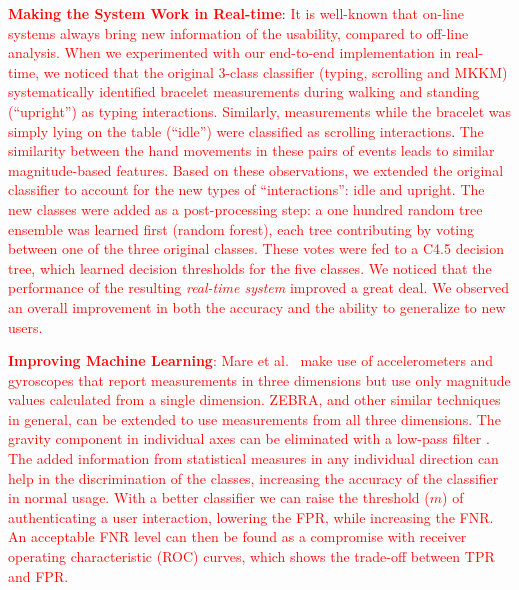 \documentclass[conference]{IEEEtran}
\newcommand{\zebra}{ZEBRA\xspace}
\newcommand\changeMika[1]{\textcolor{red}{#1}}
\newcommand\changeAsokan[1]{\textcolor{red}{#1}}
\newcommand\changeMika[1]{{#1}}
\newcommand\changeAsokan[1]{{#1}}
\begin{document}
\vspace{1mm}
\noindent\textbf{\changeMika{Making the System Work in Real-time}}:
\changeMika{
It is well-known that on-line systems always bring new information of the usability, compared to off-line analysis. When we experimented with our end-to-end implementation in real-time, we noticed that} \changeAsokan{the original 3-class classifier (typing, scrolling and MKKM)} \changeMika{systematically} \changeAsokan{identified} \changeMika{bracelet} \changeAsokan{measurements} \changeMika{during walking and standing (``upright'')} \changeAsokan{as typing interactions. Similarly, measurements while the bracelet was simply} \changeMika{lying on the table (``idle'')} \changeAsokan{were classified as scrolling interactions}. \changeMika{The similarity between the} \changeAsokan{hand} \changeMika{movements in these} \changeAsokan{pairs of events} \changeMika{leads to similar magnitude-based features. Based on these observations, we} \changeAsokan{extended the original classifier to account for the new types of ``interactions'': idle and upright.} \changeAsokan{The new} \changeMika{classes were added as a post-processing step: a one hundred random tree ensemble was learned first (random forest), each tree contributing by voting between one of the three original classes. These} \changeAsokan{votes} \changeMika{were fed to a C4.5 decision tree, which learned decision thresholds for the five classes.
We noticed that} \changeAsokan{the performance of the resulting \textit{real-time system}} \changeMika{improved a great deal. 
We observed an overall improvement in} \changeAsokan{both} \changeMika{the accuracy and the ability} \changeAsokan{to generalize to} \changeMika{new users.} 


\vspace{1mm}
\changeMika{\noindent\textbf{Improving Machine Learning}:} \changeAsokan{Mare et al.~\cite{mare2014zebra} make use of accelerometers and gyroscopes that report measurements in three dimensions but use only magnitude values calculated from a single dimension. \zebra, and other similar techniques in general, can be extended to use measurements from all three dimensions.} \changeMika{The gravity component in individual axes can be eliminated with a low-pass filter \cite{sensorevent}. The added information from statistical measures in any individual direction can help in the discrimination of the classes, increasing the accuracy of the classifier in normal usage. With a better classifier we can raise the threshold ($m$) of authenticating a user interaction, lowering the FPR, while increasing the FNR. An acceptable FNR level can then be found as a compromise with receiver operating characteristic (ROC) curves, which shows the trade-off between TPR and FPR.}
\end{document}
